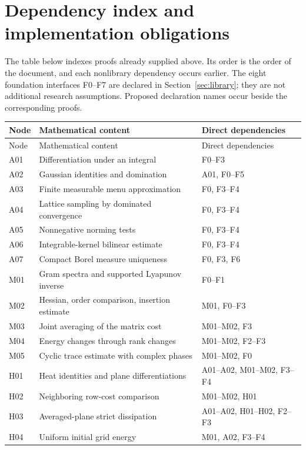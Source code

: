\documentclass[11pt]{article}
\theoremstyle{remark}\newtheorem{remark}[theorem]{Remark}
\begin{document}
\clearpage
\appendix
\section{Dependency index and implementation obligations}\label{sec:implementation}
The table below indexes proofs already supplied above. Its order is the order of the document, and each nonlibrary dependency occurs earlier. The eight foundation interfaces F0--F7 are declared in Section~\ref{sec:library}; they are not additional research assumptions. Proposed declaration names occur beside the corresponding proofs.

\begingroup\small
\setlength{\tabcolsep}{4pt}
\begin{longtable}{@{}p{0.47in}p{2.86in}p{2.78in}@{}}
\toprule
Node & Mathematical content & Direct dependencies\\
\midrule\endfirsthead
\toprule
Node & Mathematical content & Direct dependencies\\
\midrule\endhead
\bottomrule\endfoot
A01 & Differentiation under an integral & F0--F3\\
A02 & Gaussian identities and domination & A01, F0--F5\\
A03 & Finite measurable menu approximation & F0, F3--F4\\
A04 & Lattice sampling by dominated convergence & F0, F3--F4\\
A05 & Nonnegative norming tests & F0, F3--F4\\
A06 & Integrable-kernel bilinear estimate & F0, F3--F4\\
A07 & Compact Borel measure uniqueness & F0, F3, F6\\
M01 & Gram spectra and supported Lyapunov inverse & F0--F1\\
M02 & Hessian, order comparison, insertion estimate & M01, F0--F3\\
M03 & Joint averaging of the matrix cost & M01--M02, F3\\
M04 & Energy changes through rank changes & M01--M02, F2--F3\\
M05 & Cyclic trace estimate with complex phases & M01--M02, F0\\
H01 & Heat identities and plane differentiations & A01--A02, M01--M02, F3--F4\\
H02 & Neighboring row-cost comparison & M01--M02, H01\\
H03 & Averaged-plane strict dissipation & A01--A02, H01--H02, F2--F3\\
H04 & Uniform initial grid energy & M01, A02, F3--F4\\

\end{longtable}
\end{document}

